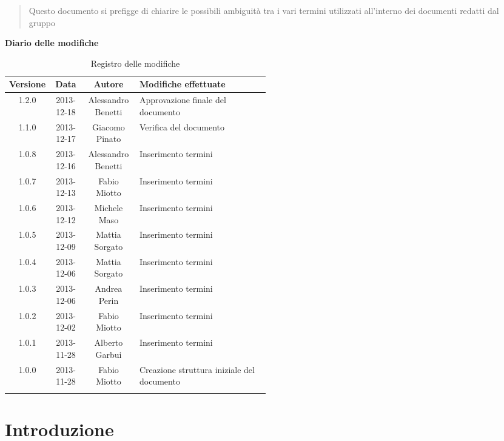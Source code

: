\begin{abstract}
\begin{center}
Questo documento si prefigge di chiarire le possibili ambiguità tra i vari termini utilizzati all'interno dei documenti redatti dal gruppo \NomeGruppo{}
\end{center}
\end{abstract}

\newpage
\textbf{Diario delle modifiche}
\begin{center}
\begin{longtable}{|c|c|c|p{0.5\linewidth}|}
\toprule
\textbf{Versione} & \textbf{Data} & \textbf{Autore} & \textbf{Modifiche effettuate}\\
\midrule
1.2.0 & 2013-12-18 & Alessandro Benetti & Approvazione finale del documento\\
\midrule
1.1.0 & 2013-12-17 & Giacomo Pinato & Verifica del documento \\
\midrule
1.0.8 & 2013-12-16 & Alessandro Benetti & Inserimento termini\\
\midrule
1.0.7 & 2013-12-13 & Fabio Miotto & Inserimento termini\\
\midrule
1.0.6 & 2013-12-12 & Michele Maso & Inserimento termini\\
\midrule
1.0.5 & 2013-12-09 & Mattia Sorgato & Inserimento termini\\
\midrule
1.0.4 & 2013-12-06 & Mattia Sorgato & Inserimento termini \\
\midrule
1.0.3 & 2013-12-06 & Andrea Perin & Inserimento termini\\
\midrule
1.0.2 & 2013-12-02 & Fabio Miotto & Inserimento termini\\
\midrule
1.0.1 & 2013-11-28 & Alberto Garbui & Inserimento termini\\
\midrule
1.0.0 & 2013-11-28 & Fabio Miotto & Creazione struttura iniziale del documento\\


\bottomrule
\caption{Registro delle modifiche}
\label{tab:changelog}
\end{longtable}
\end{center}

\newpage
\tableofcontents

\newpage
\section{Introduzione}%
\label{1.0}
